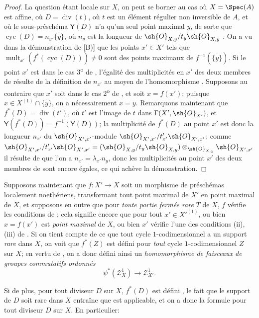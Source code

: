 \begin{proof}
La question étant locale sur $X$, on peut se borner au cas où $X=\Spec(A)$ est affine, où $D=\operatorname{div}(t)$, où $t$ est un élément régulier non inversible de $A$, et où le sous-préschéma $\boldsymbol{\mathsf{Y}}(D)$  n'a qu'un seul point maximal $y$, de sorte que $\operatorname{cyc}(D)=n_y.\overline{\{y\}}$, où $n_y$ est la longueur de $\sh{O}_{X,y}/t_y\sh{O}_{X,y}$ .
On a vu dans la démonstration de [B)] que les points $x'\in X'$ tels que $\operatorname{mult}_{x'}(f^*(\operatorname{cyc}(D)))\neq0$ sont des points maximaux de $f^{-1}(\overline{\{y\}})$.
Si le point $x'$ est dans le cas 3\textsuperscript{o} de , l'égalité des multiplicités en $x'$ des deux membres de  résulte de la définition de $n_{x'}$ au moyen de l'homomorphisme .
Supposons au contraire que $x'$ soit dans le cas 2\textsuperscript{o} de , et soit $x=f(x')$;
puisque $x\in X^{(1)}\cap\overline{\{y\}}$, on a nécessairement $x=y$.
Remarquons maintenant que $f^*(D)=\operatorname{div}(t')$, où $t'$ est l'image de $t$ dans $\Gamma(X',\sh{O}_{X'})$, et $\boldsymbol{\mathsf{Y}}(f^*(D))=f^{-1}(\boldsymbol{\mathsf{Y}}(D))$;
la multiplicité de $f^*(D)$ au point $x'$ est donc la longueur $n_{x'}$ du $\sh{O}_{X',x'}$-module $\sh{O}_{X',x'}/t'_{x'}\sh{O}_{X',x'}$;
comme $\sh{O}_{X',x'}/t'_{x'}\sh{O}_{X',x'}=(\sh{O}_{X,y}/t_y\sh{O}_{X,y})\otimes_{\sh{O}_{X,y}}\sh{O}_{X',x'}$ il résulte de  que l'on a $n_{x'}=\lambda_{x'}n_y$, donc les multiplicités au point $x'$ des deux membres de  sont encore égales, ce qui achève la démonstration.
\end{proof}

\begin{env}[21.10.5]
\label{IV.21.10.5}
Supposons maintenant que $f:X'\to X$ soit un morphisme de préschémas localement noethériens, transformant tout point maximal de $X'$ en point maximal de $X$, et supposons en outre que pour \emph{toute partie fermée rare} $T$ de $X$, $f$ vérifie les conditions
de ;
cela signifie encore que pour tout $x'\in X'^{(1)}$, ou bien $x=f(x')$ est \emph{point maximal} de $X$, ou bien $x'$ vérifie l'une des conditions (ii), (iii) de .
Si on tient compte de ce que tout cycle $1$-codimensionnel a un support \emph{rare} dans $X$, on voit que $f^*(Z)$ est défini pour \emph{tout} cycle $1$-codimensionnel $Z$ sur $X$;
en vertu de , on a donc défini ainsi un \emph{homomorphisme de faisceaux de groupes commutatifs ordonnés}
\[
  \psi^*(\mathscr{Z}^1_X)\to\mathscr{Z}^1_{X'}.
\]

Si de plus, pour tout diviseur $D$ sur $X$, $f^*(D)$ est défini , le fait que le support de $D$ soit rare dans $X$  entraîne que  est applicable, et on a donc la formule  pour tout diviseur $D$ sur $X$.
En particulier:
\end{env}

